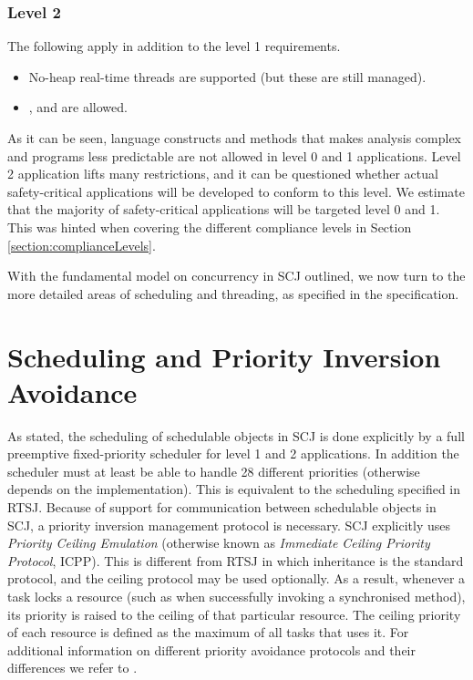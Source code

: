 \subsubsection{Level 2}
The following apply in addition to the level 1 requirements.
\begin{itemize}
	\item No-heap real-time threads are supported (but these are still managed).
	\item {},  and  are allowed.
\end{itemize}

As it can be seen, language constructs and methods that makes analysis complex and programs less predictable are not allowed in level 0 and 1 applications. Level 2 application lifts many restrictions, and it can be questioned whether actual safety-critical applications will be developed to conform to this level. We estimate that the majority of safety-critical applications will be targeted level 0 and 1. This was hinted when covering the different compliance levels in Section \ref{section:complianceLevels}.

With the fundamental model on concurrency in SCJ outlined, we now turn to the more detailed areas of scheduling and threading, as specified in the specification.

\section{Scheduling and Priority Inversion Avoidance} %
\label{sub:schedulingobjects}
As stated, the scheduling of schedulable objects in SCJ is done explicitly by a full preemptive fixed-priority scheduler for level 1 and 2 applications. In addition the scheduler must at least be able to handle 28 different priorities (otherwise depends on the implementation). This is equivalent to the scheduling specified in RTSJ. Because of support for communication between schedulable objects in SCJ, a priority inversion management protocol is necessary. SCJ explicitly uses \textit{Priority Ceiling Emulation} (otherwise known as \textit{Immediate Ceiling Priority Protocol}, ICPP). This is different from RTSJ in which inheritance is the standard protocol, and the ceiling protocol may be used optionally. As a result, whenever a task locks a resource (such as when successfully invoking a synchronised method), its priority is raised to the ceiling of that particular resource. The ceiling priority of each resource is defined as the maximum of all tasks that uses it. For additional information on different priority avoidance protocols and their differences we refer to \cite{alan2001real}.

